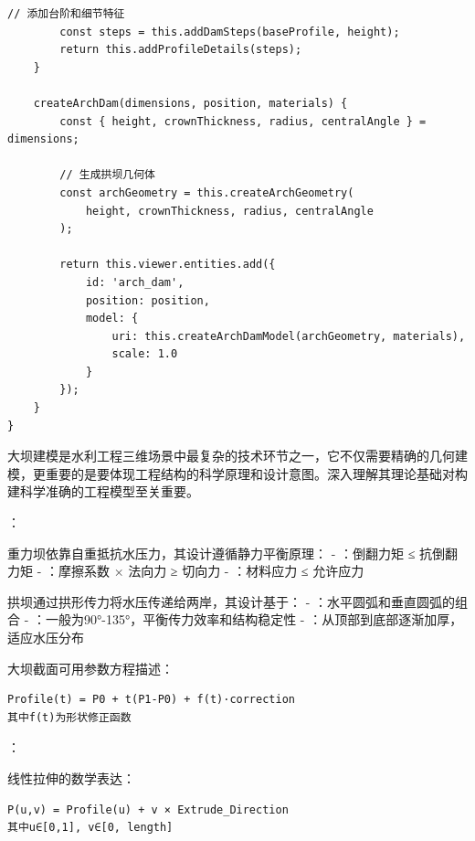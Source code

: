 \begin{lstlisting}[style=javascript]
        // 添加台阶和细节特征
        const steps = this.addDamSteps(baseProfile, height);
        return this.addProfileDetails(steps);
    }
    
    createArchDam(dimensions, position, materials) {
        const { height, crownThickness, radius, centralAngle } = dimensions;
        
        // 生成拱坝几何体
        const archGeometry = this.createArchGeometry(
            height, crownThickness, radius, centralAngle
        );
        
        return this.viewer.entities.add({
            id: 'arch_dam',
            position: position,
            model: {
                uri: this.createArchDamModel(archGeometry, materials),
                scale: 1.0
            }
        });
    }
}
\end{lstlisting}


大坝建模是水利工程三维场景中最复杂的技术环节之一，它不仅需要精确的几何建模，更重要的是要体现工程结构的科学原理和设计意图。深入理解其理论基础对构建科学准确的工程模型至关重要。

：


重力坝依靠自重抵抗水压力，其设计遵循静力平衡原理： - ：倒翻力矩 ≤ 抗倒翻力矩 - ：摩擦系数 × 法向力 ≥ 切向力 - ：材料应力 ≤ 允许应力


拱坝通过拱形传力将水压传递给两岸，其设计基于： - ：水平圆弧和垂直圆弧的组合 - ：一般为90°-135°，平衡传力效率和结构稳定性 - ：从顶部到底部逐渐加厚，适应水压分布


大坝截面可用参数方程描述：

\begin{lstlisting}
Profile(t) = P0 + t(P1-P0) + f(t)·correction
其中f(t)为形状修正函数
\end{lstlisting}

：


线性拉伸的数学表达：

\begin{lstlisting}
P(u,v) = Profile(u) + v × Extrude_Direction
其中u∈[0,1], v∈[0, length]
\end{lstlisting}

